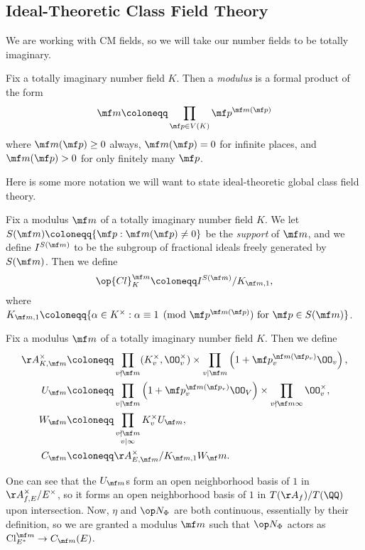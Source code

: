 \documentclass[../notes.tex]{subfiles}
\begin{document}
\subsection{Ideal-Theoretic Class Field Theory}
We are working with CM fields, so we will take our number fields to be totally imaginary.
\begin{definition}[modulus]
	Fix a totally imaginary number field $K$. Then a \textit{modulus} is a formal product of the form
	\[\mf m\coloneqq\prod_{\mf p\in V(K)}\mf p^{\mf m(\mf p)}\]
	where $\mf m(\mf p)\ge0$ always, $\mf m(\mf p)=0$ for infinite places, and $\mf m(\mf p)>0$ for only finitely many $\mf p$.
\end{definition}
Here is some more notation we will want to state ideal-theoretic global class field theory.
\begin{definition}
	Fix a modulus $\mf m$ of a totally imaginary number field $K$. We let $S(\mf m)\coloneqq\{\mf p:\mf m(\mf p)\ne0\}$ be the \textit{support} of $\mf m$, and we define $I^{S(\mf m)}$ to be the subgroup of fractional ideals freely generated by $S(\mf m)$. Then we define
	\[{\op{Cl}^{\mf m}_K}\coloneqq I^{S(\mf m)}/K_{\mf m,1},\]
	where $K_{\mf m,1}\coloneqq\{\alpha\in K^\times:\alpha\equiv1\pmod{\mf p^{\mf m(\mf p)}}\text{ for }\mf p\in S(\mf m)\}$.
\end{definition}
\begin{definition}
	Fix a modulus $\mf m$ of a totally imaginary number field $K$. Then we define
	\begin{align*}
		\AA_{K,\mf m}^\times &\coloneqq \prod_{v\nmid\mf m}(K_v^\times,\OO_v^\times)\times\prod_{v\mid\mf m}\left(1+\mf p_v^{\mf m(\mf p_v)}\OO_v\right), \\
		U_{\mf m} &\coloneqq\prod_{v\mid\mf m}\left(1+\mf p_v^{\mf m(\mf p_v)}\OO_V\right)\times\prod_{v\nmid\mf m\infty}\OO_v^\times, \\
		W_{\mf m} &\coloneqq \prod_{\substack{v\nmid\mf m\\v\mid\infty}}K_v^\times U_{\mf m}, \\
		C_{\mf m} &\coloneqq \AA_{E,\mf m}^\times/K_{\mf m,1}W_\mf m.
	\end{align*}
\end{definition}
\begin{remark}
	One can see that the $U_{\mf m}$s form an open neighborhood basis of $1$ in $\AA_{f,E}^\times/E^\times$, so it forms an open neighborhood basis of $1$ in $T(\AA_f)/T(\QQ)$ upon intersection. Now, $\eta$ and $\op N_\Phi$ are both continuous, essentially by their definition, so we are granted a modulus $\mf m$ such that $\op N_\Phi$ actors as $\mathrm{Cl}^{\mf m}_{E^*}\to C_{\mf m}(E)$.
\end{remark}
\end{document}
